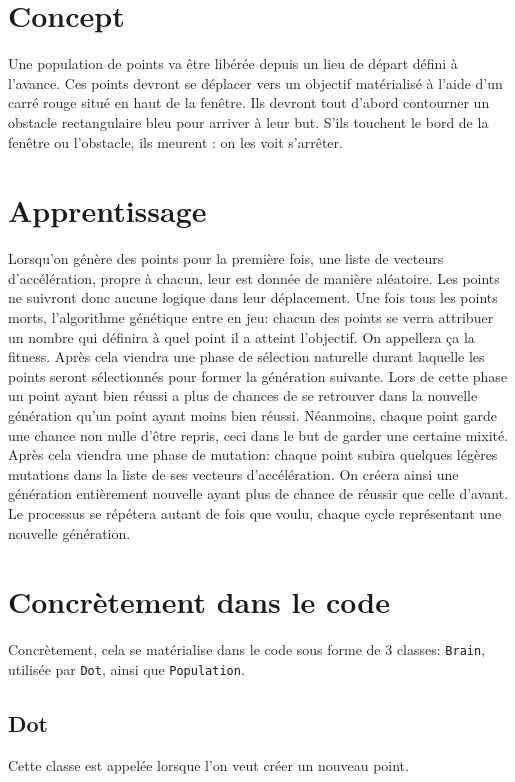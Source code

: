 \documentclass[12pt, a4paper, openany]{book}
\begin{document}
\section{Concept}
Une population de points va être libérée depuis un lieu de départ défini à l'avance. Ces points devront se déplacer vers un objectif matérialisé à l'aide d'un carré rouge situé en haut de la fenêtre. Ils devront tout d'abord contourner un obstacle rectangulaire bleu pour arriver à leur but. S'ils touchent le bord de la fenêtre ou l'obstacle, ils \og meurent\fg{} : on les voit s’arrêter.
\newline

\section{Apprentissage}
\label{r:1.3}
Lorsqu'on génère des points pour la première fois, une liste de vecteurs d'accélération, propre à chacun, leur est donnée de manière aléatoire. Les points ne suivront donc aucune logique dans leur déplacement. Une fois tous les points morts, l’algorithme génétique entre en jeu: chacun des points se verra attribuer un nombre qui définira à quel point il a atteint l'objectif. On appellera ça la \og fitness\fg{}. Après cela viendra une phase de sélection naturelle durant laquelle les points seront sélectionnés pour former la génération suivante. Lors de cette phase un point ayant bien réussi a plus de chances de se retrouver dans la nouvelle génération qu'un point ayant moins bien réussi. Néanmoins, chaque point garde une chance non nulle d'être repris, ceci dans le but de garder une certaine mixité. Après cela viendra une phase de mutation: chaque point subira quelques légères mutations dans la liste de ses vecteurs d'accélération. On créera ainsi une génération entièrement nouvelle ayant plus de chance de réussir que celle d'avant. Le processus se répétera autant de fois que voulu, chaque cycle représentant une nouvelle génération.\newline


\section{Concrètement dans le code}
Concrètement, cela se matérialise dans le code sous forme de 3 classes: \verb'Brain', utilisée par \verb'Dot', ainsi que \verb'Population'. 

\subsection{Dot}
Cette classe est appelée lorsque l'on veut créer un nouveau point.
\end{document}
